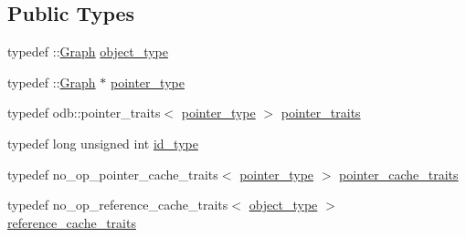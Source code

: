 \subsection*{Public Types}
\begin{DoxyCompactItemize}
\item 
typedef \+::\hyperlink{class_graph}{Graph} \hyperlink{classodb_1_1access_1_1object__traits_3_01_1_1_graph_01_4_afa0cff44a76673f5041354954c384561}{object\+\_\+type}
\item 
typedef \+::\hyperlink{class_graph}{Graph} $\ast$ \hyperlink{classodb_1_1access_1_1object__traits_3_01_1_1_graph_01_4_a125458878bb21ff928cedf5be575500b}{pointer\+\_\+type}
\item 
typedef odb\+::pointer\+\_\+traits$<$ \hyperlink{classodb_1_1access_1_1object__traits_3_01_1_1_graph_01_4_a125458878bb21ff928cedf5be575500b}{pointer\+\_\+type} $>$ \hyperlink{classodb_1_1access_1_1object__traits_3_01_1_1_graph_01_4_a52b969df9ca8e679089f25bf3e4ba93d}{pointer\+\_\+traits}
\item 
typedef long unsigned int \hyperlink{classodb_1_1access_1_1object__traits_3_01_1_1_graph_01_4_a35b244d76be8f48c5a92e1e9e9c28657}{id\+\_\+type}
\item 
typedef no\+\_\+op\+\_\+pointer\+\_\+cache\+\_\+traits$<$ \hyperlink{classodb_1_1access_1_1object__traits_3_01_1_1_graph_01_4_a125458878bb21ff928cedf5be575500b}{pointer\+\_\+type} $>$ \hyperlink{classodb_1_1access_1_1object__traits_3_01_1_1_graph_01_4_a53750b6c83b40a35a9832889ce4bb241}{pointer\+\_\+cache\+\_\+traits}
\item 
typedef no\+\_\+op\+\_\+reference\+\_\+cache\+\_\+traits$<$ \hyperlink{classodb_1_1access_1_1object__traits_3_01_1_1_graph_01_4_afa0cff44a76673f5041354954c384561}{object\+\_\+type} $>$ \hyperlink{classodb_1_1access_1_1object__traits_3_01_1_1_graph_01_4_aeae80795564282b80ec224617147bf7a}{reference\+\_\+cache\+\_\+traits}
\end{DoxyCompactItemize}
